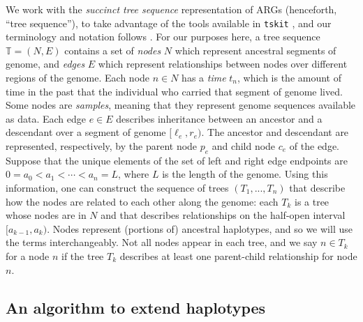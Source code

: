 \documentclass[10pt,twoside,lineno]{gsajnl}
\newcommand{\T}{\mathbb{T}}
\newcommand{\tskit}{\texttt{tskit}}
\begin{document}
We work with the \emph{succinct tree sequence} representation of ARGs (henceforth, ``tree sequence''),
to take advantage of the %
tools available in \tskit{} \citep{tskit}, 
and our terminology and notation follows \citet{ralph2020efficiently}.
For our purposes here,
a tree sequence $\T = (N, E)$ contains a set of \emph{nodes} $N$ 
which represent ancestral segments of genome,
and \emph{edges} $E$ which represent relationships between nodes over different regions of the genome.
Each node $n \in N$ has a \emph{time} $t_n$,
which is the amount of time in the past that the individual who carried that segment of genome lived. 
Some nodes are \emph{samples}, meaning that they represent genome sequences available as data.
Each edge $e \in E$ describes inheritance between an ancestor and a descendant
over a segment of genome $[\ell_e, r_e)$.
The ancestor and descendant are represented, respectively, by the parent node $p_e$ and child node $c_e$ of the edge. 
Suppose that the unique elements of the set of left and right edge endpoints
are $0 = a_0 < a_1 < \cdots < a_{n} = L$, where $L$ is the length of the genome.
Using this information, one can construct the sequence of 
trees $\left(T_1,...,T_{n}\right)$ that describe how the nodes are related to each other along the genome:
each $T_k$ is a tree whose nodes are in $N$
and that describes relationships on the half-open interval $[a_{k-1}, a_k)$.
Nodes represent (portions of) ancestral haplotypes, and so
we will use the terms interchangeably.
Not all nodes appear in each tree,
and we say $n \in T_k$ for a node $n$ if the tree $T_k$ describes at least one parent-child relationship
for node $n$.

\subsection{An algorithm to extend haplotypes}
\end{document}
